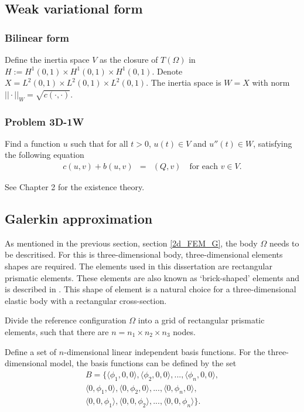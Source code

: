 \documentclass[../../main.tex]{subfiles}
\begin{document}
\subsection{Weak variational form}

\subsubsection{Bilinear form}
Define the inertia space $V$ as the closure of $T(\Omega)$ in $H := H^1(0,1)\times H^1(0,1)\times H^1(0,1)$. Denote $X = L^2(0,1)\times L^2(0,1)\times L^2(0,1)$. The inertia space is $W  = X$ with norm $||\cdot||_W = \sqrt{c(\cdot,\cdot)}$.

\subsubsection{Problem 3D-1W}
Find a function $u$ such that for all $t>0$, $u(t) \in V$ and $u''(t) \in W$, satisfying the following equation
\begin{eqnarray}
	c(u,v) + b(u,v) & = & (Q,v) \ \ \ \textrm{ for each } v \in V.
\end{eqnarray}

See Chapter 2 for the existence theory.

\subsection{Galerkin approximation}
As mentioned in the previous section, section \ref{2d_FEM_G}, the body $\Omega$ needs to be descritised. For this is three-dimensional body, three-dimensional elements shapes are required. The elements used in this dissertation are rectangular prismatic elements. These elements are also known as `brick-shaped' elements and is described in \cite{Wu06}. This shape of element is a natural choice for a three-dimensional elastic body with a rectangular cross-section.

Divide the reference configuration $\Omega$ into a grid of rectangular prismatic elements, such that there are $n = n_1 \times n_2 \times n_3$ nodes.

Define a set of $n$-dimensional linear independent basis functions. For the three-dimensional model, the basis functions can be defined by the set
\begin{eqnarray*}
 B = \{\langle\phi_1, 0 , 0\rangle, \langle\phi_2, 0, 0\rangle,...,\langle\phi_{n}, 0, 0 \rangle,\\
	\langle 0,\phi_1 ,0 \rangle,\langle 0 ,\phi_2,0\rangle,...,\langle 0,\phi_{n},0\rangle,\\
	\langle 0,0,\phi_1 \rangle,\langle 0,0,\phi_2\rangle,...,\langle 0,0,\phi_{n}\rangle \}.
\end{eqnarray*}
\end{document}
